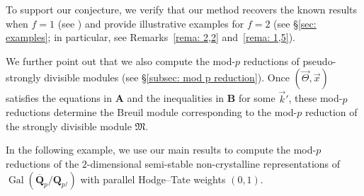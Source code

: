 \documentclass[11pt]{amsart}
\theoremstyle{definition}
\numberwithin{equation}{subsection}
\theoremstyle{plain}
\theoremstyle{plain}
\theoremstyle{plain}
\theoremstyle{plain}
\theoremstyle{plain}
\theoremstyle{plain}
\theoremstyle{plain}
\theoremstyle{plain}
\theoremstyle{plain}
\theoremstyle{plain}
\theoremstyle{plain}
\theoremstyle{plain}
\theoremstyle{definition}
\theoremstyle{definition}
\theoremstyle{definition}
\theoremstyle{remark}
\renewcommand{\(}{\textup{(}}
\renewcommand{\)}{\textup{)}}
\DeclareMathOperator{\Gal}{Gal}
\newcommand{\Q}{\mathbf{Q}}
\newcommand{\fM}{\mathfrak{M}}
\newcommand{\vx}{\vec{x}}
\newcommand{\vk}{\vec{k}}
\newcommand{\vTh}{\vec{\Theta}}
\begin{document}
To support our conjecture, we verify that our method recovers the known results when $f=1$ (see \cite{BM, GP, LP}) and provide illustrative examples for $f=2$ (see \S\ref{sec: examples}; in particular, see Remarks~\ref{rema: 2,2} and~\ref{rema: 1,5}).

We further point out that we also compute the mod-$p$ reductions of pseudo-strongly divisible modules (see \S\ref{subsec: mod p reduction}). Once $(\vTh, \vx)$ satisfies the equations in \textbf{A} and the inequalities in \textbf{B} for some $\vk'$, these mod-$p$ reductions determine the Breuil module corresponding to the mod-$p$ reduction of the strongly divisible module $\fM$.

In the following example, we use our main results to compute the mod-$p$ reductions of the $2$-dimensional semi-stable non-crystalline representations of $\Gal(\overline{\Q}_p/\Q_{p^f})$ with parallel Hodge--Tate weights $(0,1)$.
\end{document}
